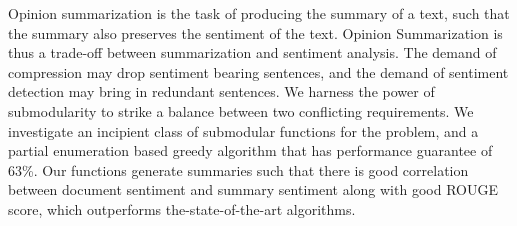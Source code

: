 Opinion summarization is the task of producing the summary of a text, such that the summary also preserves the sentiment of the text. Opinion Summarization is thus a trade-off between summarization and sentiment analysis. The demand of compression may drop sentiment bearing sentences, and the demand of sentiment detection may bring in redundant sentences. We harness the power of submodularity to strike a balance between two conflicting requirements. We investigate an incipient class of submodular functions for the problem, and a partial enumeration based greedy algorithm that has performance guarantee of 63\%. Our functions generate summaries such that there is good correlation between document sentiment and summary sentiment along with good ROUGE score, which outperforms the-state-of-the-art algorithms.
